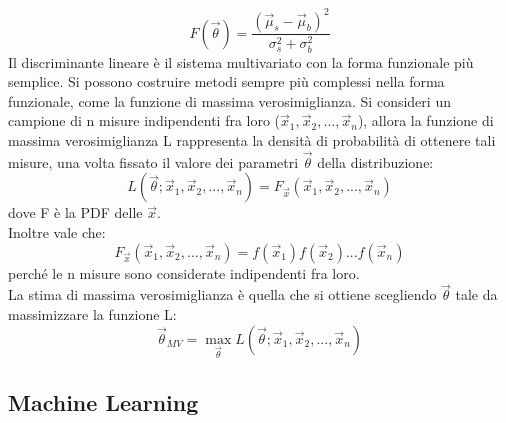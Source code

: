 \begin{equation}
F(\vec{\theta}) = \frac{(\vec\mu_s - \vec\mu_b)^2}{\sigma_s^2 + \sigma_b^2}
\end{equation} 
Il discriminante lineare è il sistema multivariato con la forma funzionale più semplice. Si possono costruire metodi sempre più complessi nella forma funzionale, come la funzione di massima verosimiglianza. Si consideri un campione di n misure indipendenti fra loro ($\vec{x}_1 , \vec{x}_2 , ... , \vec{x}_n$), allora la funzione di massima verosimiglianza L rappresenta la densità di probabilità di ottenere tali misure, una volta fissato il valore dei parametri $\vec{\theta}$ della distribuzione:
\begin{equation}
	L(\vec{\theta};\vec{x}_1 , \vec{x}_2 , ... , \vec{x}_n) = 
	F_{\vec{x}} (\vec{x}_1 , \vec{x}_2 , ... , \vec{x}_n )
\end{equation}
dove F è la PDF delle $\vec{x}$. \\ 
Inoltre vale che:
\begin{equation}
	F_{\vec{x}} (\vec{x}_1 , \vec{x}_2 , ... , \vec{x}_n ) = f(\vec{x}_1) f (\vec{x}_2) ... f(\vec{x}_n)
\end{equation}
perché le n misure sono considerate indipendenti fra loro. \\
La stima di massima verosimiglianza è quella che si ottiene scegliendo $\vec{\theta}$ tale da massimizzare la funzione L:
\begin{equation}
	\vec{\theta}_{MV} = \max_{\vec{\theta}} L(\vec{\theta};\vec{x}_1 , \vec{x}_2 , ... , \vec{x}_n)
\end{equation}


\newpage


\subsection{Machine Learning}
\label{ML}

